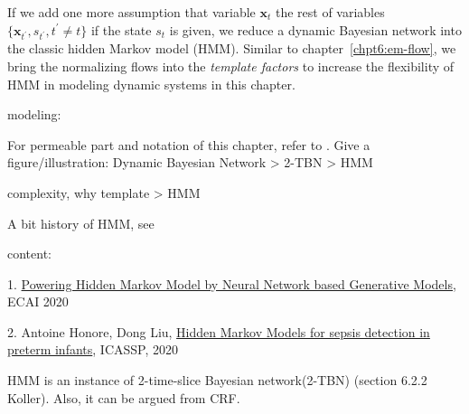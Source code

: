 If we add one more assumption that variable $\bm{x}_t$ the rest of variables $\{\bm{x}_{t^{\prime}}, {s}_{t^{\prime}}, t^{\prime}\neq t \}$ if the state $s_t$ is given, we reduce a dynamic Bayesian network into the classic hidden Markov model (HMM). Similar to chapter~\ref{chpt6:em-flow}, we bring the normalizing flows into the \textit{template factors} to increase the flexibility of HMM in modeling dynamic systems in this chapter.



modeling:

For permeable part and notation of this chapter, refer to \cite[Chapter~6.2]{koller2009pgm}.
Give a figure/illustration: Dynamic Bayesian Network > 2-TBN > HMM


complexity, why template > HMM


A bit history of HMM, see \cite[Chapter~6.8]{koller2009pgm}

content:

1. \href{https://arxiv.org/abs/1910.05744}{Powering Hidden Markov Model by Neural Network based Generative Models}, ECAI 2020

2. Antoine Honore, Dong Liu, \href{https://arxiv.org/pdf/1910.13904.pdf}{Hidden Markov Models for sepsis detection in preterm infants}, ICASSP, 2020

HMM is an instance of 2-time-slice Bayesian network(2-TBN) (section 6.2.2 Koller). Also, it can be argued from CRF.
